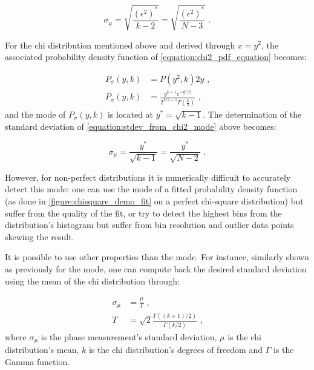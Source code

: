 \begin{equation}
    \sigma_{\mu} = \sqrt{\frac{(\epsilon^2)^*}{k - 2}} = \sqrt{\frac{(\epsilon^2)^*}{N - 3}} \text{ .}
    \label{equation:stdev_from_chi2_mode}
\end{equation}

For the chi distribution mentioned above and derived through \(x = y^2\), the associated probability density function of \cref{equation:chi2_pdf_equation} becomes:

\begin{equation}
    \begin{aligned}
        P_{\sigma}(y , k) &= P (y^2 , k) 2y \text{ ,} \\
        P_{\sigma}(y , k) &= \frac{y^{k-1} e^{-y^2/2}} {2^{k/2-1} \Gamma(\frac{k}{2})} \text{ ,}
    \end{aligned}
    \label{equation:chi_pdf}  
\end{equation}
and the mode of \(P_{\sigma}(y , k)\) is located at \(y^*=\sqrt{k-1}\).
The determination of the standard deviation of \cref{equation:stdev_from_chi2_mode} above becomes:

\begin{equation}
    \sigma_{\mu} = \frac{y^*}{\sqrt{k - 1}} = \frac{y^*}{\sqrt{N - 2}} \text{ .}
    \label{equation:stdev_from_chi_mode}
\end{equation}

However, for non-perfect distributions it is numerically difficult to accurately detect this mode: one can use the mode of a fitted probability density function (as done in \cref{figure:chisquare_demo_fit} on a perfect chi-square distribution) but suffer from the quality of the fit, or try to detect the highest bins from the distribution's histogram but suffer from bin resolution and outlier data points skewing the result.

It is possible to use other properties than the mode.
For instance, similarly shown as previously for the mode, one can compute back the desired standard deviation using the mean of the chi distribution through:

\begin{equation}
	\begin{aligned}
        \sigma_{\mu} &= \frac{\mu}{T} \text{ ,} \\
        T            &= \sqrt{2} \frac{\Gamma((k + 1) / 2)}{\Gamma(k / 2)} \text{ ,}
	\end{aligned}	
    \label{equation:stdev_from_chi_mean}
\end{equation}
where \(\sigma_{\mu}\) is the phase measurement's standard deviation, \(\mu\) is the chi distribution's mean, \(k\) is the chi distribution's degrees of freedom and \(\Gamma\) is the Gamma function.
\newline

